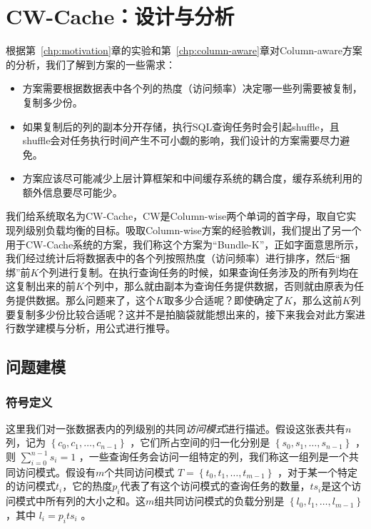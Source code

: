 \chapter{CW-Cache：设计与分析}
\label{chp:cw-cache}

\par 根据第~\ref{chp:motivation}章的实验和第~\ref{chp:column-aware}章对Column-aware方案的分析，我们了解到方案的一些需求：
\begin{itemize}
    \item 方案需要根据数据表中各个列的热度（访问频率）决定哪一些列需要被复制，复制多少份。
    \item 如果复制后的列的副本分开存储，执行SQL查询任务时会引起shuffle，且shuffle会对任务执行时间产生不可小觑的影响，我们设计的方案需要尽力避免。
    \item 方案应该尽可能减少上层计算框架和中间缓存系统的耦合度，缓存系统利用的额外信息要尽可能少。
\end{itemize}

\par 我们给系统取名为CW-Cache，CW是Column-wise两个单词的首字母，取自它实现列级别负载均衡的目标。吸取Column-wise方案的经验教训，我们提出了另一个用于CW-Cache系统的方案，我们称这个方案为“Bundle-K”，正如字面意思所示，我们经过统计后将数据表中的各个列按照热度（访问频率）进行排序，然后“捆绑”前$K$个列进行复制。在执行查询任务的时候，如果查询任务涉及的所有列均在这复制出来的前$K$个列中，那么就由副本为查询任务提供数据，否则就由原表为任务提供数据。那么问题来了，这个$K$取多少合适呢？即使确定了$K$，那么这前$K$列要复制多少份比较合适呢？这并不是拍脑袋就能想出来的，接下来我会对此方案进行数学建模与分析，用公式进行推导。

\section{问题建模}
\label{sec:bundle-k-model}

\subsection{符号定义}

\par 这里我们对一张数据表内的列级别的共同\emph{访问模式}进行描述。假设这张表共有$n$列，记为 $\left\{c_{0}, c_{1}, \dots, c_{n-1}\right\}$ ，它们所占空间的归一化分别是 $\left\{s_{0}, s_{1}, \dots, s_{n-1}\right\}$ ，则 $\sum_{i=0}^{n-1} s_i = 1$ ，一些查询任务会访问一组特定的列，我们称这一组列是一个共同访问模式。假设有$m$个共同访问模式 $T = \left\{t_{0}, t_{1}, \dots, t_{m-1}\right\}$ ，对于某一个特定的访问模式$t_i$，它的热度$p_i$代表了有这个访问模式的查询任务的数量，$ts_i$是这个访问模式中所有列的大小之和。这$m$组共同访问模式的负载分别是 $\left\{l_{0}, l_{1}, \dots, l_{m-1}\right\}$ ，其中 $l_i = p_i ts_i$ 。

